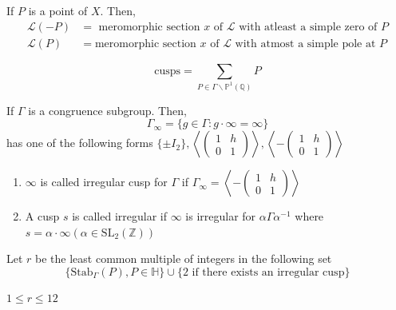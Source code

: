 \documentclass[oneside, 12pt]{scrbook}
\newcommand{\QQ}{\mathbb Q}
\newcommand{\ZZ}{\mathbb Z}
\newcommand{\PP}{\mathbb{P}}
\newcommand{\SL}{\mathrm{SL}}
\newcommand{\bs}{\backslash}
\theoremstyle{theorem}
\begin{document}
\begin{example}
If $P$ is a point of $X$. Then, 
\begin{align*}
\mathcal{L}(-P) &= \text{ meromorphic section $x$ of $\mathcal{L}$ with atleast a simple zero of $P$}\\
\mathcal{L}(P) &= \text{meromorphic section $x$ of $\mathcal{L}$ with atmost a simple pole at $P$}
\end{align*}
\end{example}

\begin{definition}
$$\text{cusps} =\sum_{P \in \Gamma \bs \PP^1(\QQ)} P$$
\end{definition}

If $\Gamma$ is a congruence subgroup. Then, $$\Gamma_{\infty} =\{g \in \Gamma: g \cdot \infty = \infty\}$$ has one of the following forms $\{\pm I_{2}\}, \left\langle \begin{pmatrix}
1 & h \\ 0 & 1 
\end{pmatrix} \right\rangle, \left\langle -\begin{pmatrix}
1 & h \\ 0 & 1 
\end{pmatrix} \right\rangle$

\begin{definition}
\begin{enumerate}
\item $\infty$ is called irregular cusp for $\Gamma$ if $\Gamma_{\infty} = \left\langle -\begin{pmatrix}
1 & h \\ 0 & 1 
\end{pmatrix} \right\rangle$
\item A cusp $s$ is called irregular if $\infty$ is irregular for $\alpha \Gamma \alpha^{-1}$ where $s= \alpha \cdot \infty (\alpha \in \SL_{2}(\ZZ))$
\end{enumerate}
\end{definition}

\begin{definition}
Let $r$ be the least common multiple of integers in the following set $$\{\mathrm{Stab}_{\Gamma}(P), P \in \mathbb{H}\} \cup \{2 \text{ if there exists an irregular cusp}\}$$
\end{definition}

\begin{exercise}
$1\le r \le 12$
\end{exercise}
\end{document}
